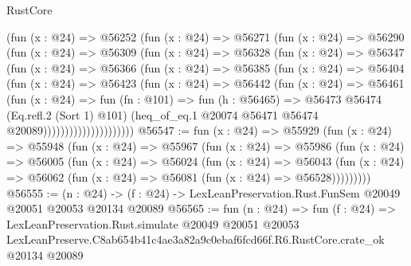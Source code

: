 \begin{lexlean}{RustCore}
\begin{coremodule}
                  (fun (x : @24) =>
                  @56252
                    (fun (x : @24) =>
                    @56271
                      (fun (x : @24) =>
                      @56290
                        (fun (x : @24) =>
                        @56309
                          (fun (x : @24) =>
                          @56328
                            (fun (x : @24) =>
                            @56347
                              (fun (x : @24) =>
                              @56366
                                (fun (x : @24) =>
                                @56385
                                  (fun (x : @24) =>
                                  @56404
                                    (fun (x : @24) =>
                                    @56423
                                      (fun (x : @24) =>
                                      @56442
                                        (fun (x : @24) =>
                                        @56461
                                          (fun (x : @24) =>
                                          fun (fn : @101) =>
                                          fun (h : @56465) =>
                                          @56473
                                            @56474
                                            (Eq.refl.{2} (Sort 1) @101)
                                            (heq_of_eq.{1}
                                              @20074
                                              @56471
                                              @56474
                                              @20089)))))))))))))))))))))
@56547 := fun (x : @24) =>
  @55929
    (fun (x : @24) =>
    @55948
      (fun (x : @24) =>
      @55967
        (fun (x : @24) =>
        @55986
          (fun (x : @24) =>
          @56005
            (fun (x : @24) =>
            @56024
              (fun (x : @24) =>
              @56043
                (fun (x : @24) => @56062 (fun (x : @24) => @56081 (fun (x : @24) => @56528)))))))))
@56555 := (n : @24) ->
  (f : @24) -> LexLeanPreservation.Rust.FunSem @20049 @20051 @20053 @20134 @20089
@56565 := fun (n : @24) =>
  fun (f : @24) =>
  LexLeanPreservation.Rust.simulate
    @20049
    @20051
    @20053
    LexLeanPreserve.C8ab654b41c4ae3a82a9c0ebaf6fcd66f.R6.RustCore.crate_ok
    @20134
    @20089
\end{coremodule}
\end{lexlean}
